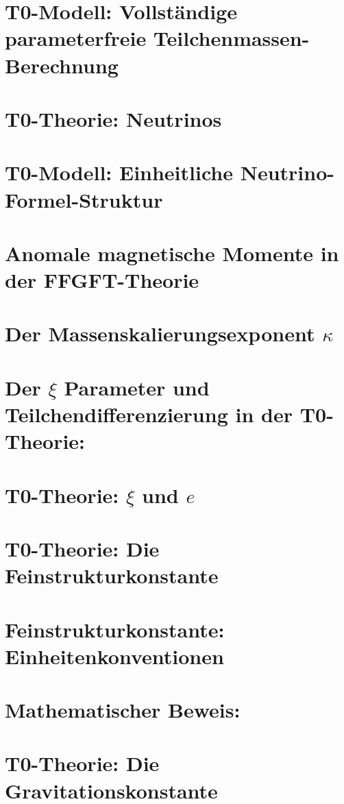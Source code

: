 	\chapter{T0-Modell: Vollständige parameterfreie Teilchenmassen-Berechnung}
	
	\chapter{T0-Theorie: Neutrinos}
	
	\chapter{T0-Modell: Einheitliche Neutrino-Formel-Struktur}
	
	\chapter{Anomale magnetische Momente in der FFGFT-Theorie}
	
	\chapter{Der Massenskalierungsexponent $\kappa$}
	
	\chapter{Der $\xi$ Parameter und Teilchendifferenzierung in der T0-Theorie:}
	
	\chapter{T0-Theorie: $\xi$ und $e$}
	
	\chapter{T0-Theorie: Die Feinstrukturkonstante}
	
	\chapter{Feinstrukturkonstante: Einheitenkonventionen}
	
	\chapter{Mathematischer Beweis:}
	
	\chapter{T0-Theorie: Die Gravitationskonstante}
	
